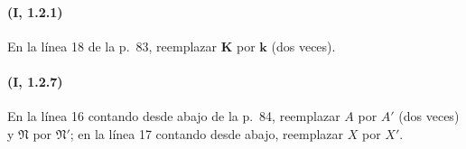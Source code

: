 \paragraph{(I, 1.2.1)}
En la línea 18 de la p.~83, reemplazar $\boldsymbol{K}$ por $\boldsymbol{k}$ (dos veces).

\paragraph{(I, 1.2.7)}
En la línea 16 contando desde abajo de la p.~84, reemplazar $A$ por
$A'$ (dos veces) y $\mathfrak N$ por $\mathfrak N'$; en la línea 17 contando desde
abajo, reemplazar $X$ por $X'$.

